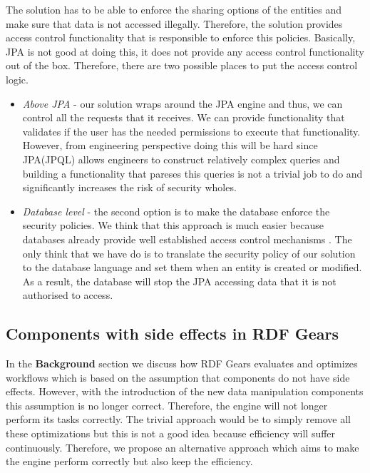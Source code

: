 The solution has to be able to enforce the sharing options of the entities and make sure that data is not accessed illegally. Therefore, the solution provides access control functionality that is responsible to enforce this policies. Basically, JPA is not good at doing this, it does not provide any access control functionality out of the box. Therefore, there are two possible places to put the access control logic. 

\begin{itemize}
	\item \textit{Above JPA} - our solution wraps around the JPA engine and thus, we can control all the requests that it receives. We can provide functionality that validates if the user has the needed permissions to execute that functionality. However, from engineering perspective doing this will be hard since JPA(JPQL) allows engineers to construct relatively complex queries and building a functionality that pareses this queries is not a trivial job to do and significantly increases the risk of security wholes.
	
	\item \textit{Database level} - the second option is to make the database enforce the security policies. We think that this approach is much easier because databases already provide well established access control mechanisms \cite{Olson08}. The only think that we have do is to translate the security policy of our solution to the database language and set them when an entity is created or modified. As a result, the database will stop the JPA accessing data that it is not authorised to access.
\end{itemize}

\subsection{Components with side effects in RDF Gears}

In the \textbf{Background} section we discuss how RDF Gears evaluates and optimizes workflows which is based on the assumption that components do not have side effects. However, with the introduction of the new data manipulation components this assumption is no longer correct. Therefore, the engine will not longer perform its tasks correctly. The trivial approach would be to simply remove all these optimizations but this is not a good idea because efficiency will suffer continuously. Therefore, we propose an alternative approach which aims to make the engine perform correctly but also keep the efficiency.

